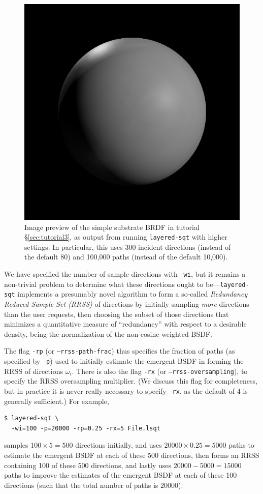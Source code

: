 \documentclass[
    twoside,
    twocolumn,
    letterpaper,
    10pt]{article}
\begin{document}
\begin{figure}
\begin{center}
    \includegraphics[width=0.75\columnwidth]{tutorial3-2.png}
    \caption{Image preview of the simple substrate BRDF in tutorial
    \S\ref{sec:tutorial3}, as output from running \texttt{layered-sqt} with
    higher settings. In particular, this uses 300 incident directions (instead
    of the default 80) and 100,000 paths (instead of the default 10,000).
    \label{fig:tutorial3-2}}
\end{center}
\end{figure}

We have specified the number of sample directions with \texttt{-wi}, but 
it remains a non-trivial problem to determine what these directions ought to 
be---\texttt{layered-sqt} implements 
a presumably novel algorithm to form a so-called \emph{Redundancy Reduced
Sample Set (RRSS)} of directions by initially sampling \emph{more} directions 
than the user requests, then choosing the subset of those directions that 
minimizes a quantitative measure of ``redundancy'' with respect to a desirable 
density, being the normalization of the non-cosine-weighted BSDF. 

The flag \texttt{-rp} (or \texttt{--rrss-path-frac}) thus specifies
the fraction of paths (as specified by \texttt{-p}) used to initially
estimate the emergent BSDF in forming the RRSS of directions $\omega_i$. 
There is also the flag \texttt{-rx} (or \texttt{--rrss-oversampling}), 
to specify the RRSS oversampling multiplier. (We discuss this flag for 
completeness, but in practice it is never really necessary to specify 
\texttt{-rx}, as the default of 4 is generally sufficient.)
For example, 
\begin{verbatim}
$ layered-sqt \
  -wi=100 -p=20000 -rp=0.25 -rx=5 File.lsqt
\end{verbatim}
samples $100\times5=500$ directions initially, and uses
$20000\times0.25=5000$ paths to estimate the emergent BSDF at each of 
these 500 directions, then forms an RRSS containing 100 of these 500 
directions, and lastly uses $20000-5000=15000$ paths to improve the 
estimates of the emergent BSDF at each of these 100 directions (such that
the total number of paths is $20000$).
\end{document}
